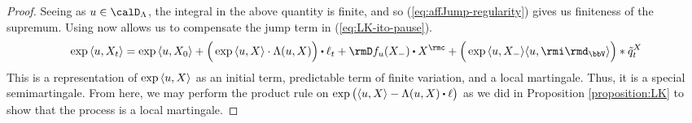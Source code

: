 \begin{proof}
  Seeing as $\momentVar \in \odeSpace$, the integral in the above quantity is finite, and so (\ref{eq:affJump-regularity}) gives us finiteness of the supremum.
  Using \cite[Proposition II.1.28]{jacod2003} now allows us to compensate the jump term in (\ref{eq:LK-ito-pause}).
  \begin{equation*}
    \exp\prj{\momentVar}{\X_t}
    = \exp\prj{\momentVar}{\X_0} + \Big( \exp\prj{\momentVar}{\X} \cdot \ode(\momentVar, \X) \Big) \shortInt \leb_t + \Der f_\momentVar(\X_-) \shortInt \X^\rmc + \Big( \exp\prj{\momentVar}{\X_-} \prj{\momentVar}{\id_\vecSpace} \Big) \ast \compensate{\jumpMeas^\X}_t 
  \end{equation*}
  This is a representation of $\exp{\langle u, X\rangle}$ as an initial term, predictable term of finite variation, and a local martingale.
  Thus, it is a special semimartingale.
  From here, we may perform the product rule on $\exp\big(\prj{\momentVar}{\X} - \ode(\momentVar, \X) \shortInt \leb\big)$ as we did in Proposition \ref{proposition:LK} to show that the process is a local martingale.
\end{proof}
